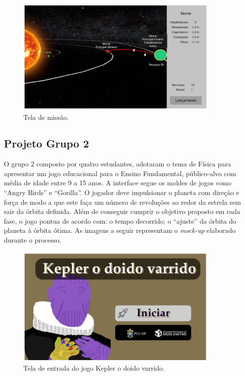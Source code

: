 \documentclass[12pt, onecolumn]{IEEEtran}
\begin{document}
    \begin{figure}[H]
    \centering
    \includegraphics[width=0.9\textwidth]{imagens/grupo1-img3.png}
    \caption{Tela de missão.}
    \label{fig:mesh1}
\end{figure}

\subsection{Projeto Grupo 2}

O grupo 2 composto por quatro estudantes, adotaram o tema de Física para apresentar um jogo educacional para o Ensino Fundamental, público-alvo com média de idade entre 9 a 15 anos. A interface segue os moldes de jogos como “Angry Birds” e “Gorilla”. O jogador deve impulsionar o planeta com direção e força de modo a que este faça um número de revoluções ao redor da estrela sem sair da órbita definida. Além de conseguir cumprir o objetivo proposto em cada fase, o jogo pontua de acordo com: o tempo decorrido; o “ajuste” da órbita do planeta à órbita ótima. As imagens a seguir representam o \textit{mock-up} elaborado durante o processo.

\begin{figure}[H]
    \centering
    \includegraphics[width=0.9\textwidth]{imagens/grupo2-img1.png}
    \caption{Tela de entrada do jogo Kepler o doido varrido.}
    \label{fig:mesh1}
\end{figure}
\end{document}
